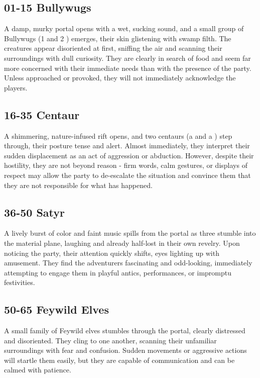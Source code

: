 \subsection*{01-15 Bullywugs}
{\entryfont A damp, murky portal opens with a wet, sucking sound, and a small group of Bullywugs (1 \hyperref[monster:BullywugBogSage]{} and 2 \hyperref[monster:BullywugWarrior]{}) emerges, their skin glistening with swamp filth. The creatures appear disoriented at first, sniffing the air and scanning their surroundings with dull curiosity. They are clearly in search of food and seem far more concerned with their immediate needs than with the presence of the party. Unless approached or provoked, they will not immediately acknowledge the players.}
\subsection*{16-35 Centaur}
{\entryfont A shimmering, nature-infused rift opens, and two centaurs (a \hyperref[monster:CentaurWarden]{} and a \hyperref[monster:CentaurTrooper]{}) step through, their posture tense and alert. Almost immediately, they interpret their sudden displacement as an act of aggression or abduction. However, despite their hostility, they are not beyond reason - firm words, calm gestures, or displays of respect may allow the party to de-escalate the situation and convince them that they are not responsible for what has happened.}
\subsection*{36-50 Satyr}
{\entryfont A lively burst of color and faint music spills from the portal as three \hyperref[monster:SatyrReveler]{} stumble into the material plane, laughing and already half-lost in their own revelry. Upon noticing the party, their attention quickly shifts, eyes lighting up with amusement. They find the adventurers fascinating and odd-looking, immediately attempting to engage them in playful antics, performances, or impromptu festivities.}
\subsection*{50-65 Feywild Elves}
{\entryfont A small family of Feywild elves stumbles through the portal, clearly distressed and disoriented. They cling to one another, scanning their unfamiliar surroundings with fear and confusion. Sudden movements or aggressive actions will startle them easily, but they are capable of communication and can be calmed with patience.}
